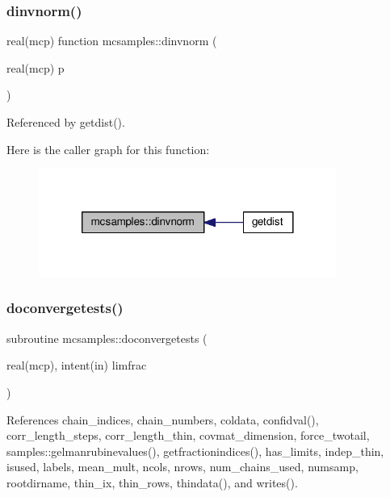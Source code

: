 \subsubsection{\texorpdfstring{dinvnorm()}{dinvnorm()}}
{\footnotesize\ttfamily real(mcp) function mcsamples\+::dinvnorm (\begin{DoxyParamCaption}\item[{real(mcp)}]{p }\end{DoxyParamCaption})}



Referenced by getdist().

Here is the caller graph for this function\+:
\nopagebreak
\begin{figure}[H]
\begin{center}
\leavevmode
\includegraphics[width=276pt]{namespacemcsamples_af7511fd6eb58bcc6086256f9ecb5fe1c_icgraph}
\end{center}
\end{figure}
\mbox{\label{namespacemcsamples_a4a0eac91a04d742f776ae4f8f15d919c}} 
\subsubsection{\texorpdfstring{doconvergetests()}{doconvergetests()}}
{\footnotesize\ttfamily subroutine mcsamples\+::doconvergetests (\begin{DoxyParamCaption}\item[{real(mcp), intent(in)}]{limfrac }\end{DoxyParamCaption})}



References chain\+\_\+indices, chain\+\_\+numbers, coldata, confidval(), corr\+\_\+length\+\_\+steps, corr\+\_\+length\+\_\+thin, covmat\+\_\+dimension, force\+\_\+twotail, samples\+::gelmanrubinevalues(), getfractionindices(), has\+\_\+limits, indep\+\_\+thin, isused, labels, mean\+\_\+mult, ncols, nrows, num\+\_\+chains\+\_\+used, numsamp, rootdirname, thin\+\_\+ix, thin\+\_\+rows, thindata(), and writes().



